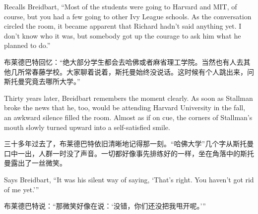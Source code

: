 \ifdefined\eng
Recalls Breidbart, ``Most of the students were going to Harvard and MIT, of course, but you had a few going to other Ivy League schools. As the conversation circled the room, it became apparent that Richard hadn't said anything yet. I don't know who it was, but somebody got up the courage to ask him what he planned to do.''
\fi

\ifdefined\chs
布莱德巴特回忆：``绝大部分学生都会去哈佛或者麻省理工学院。当然也有人去其他几所常春藤学校。大家聊着说着，斯托曼始终没说话。这时候有个人跳出来，问斯托曼究竟去哪所大学。''
\fi

\ifdefined\eng
Thirty years later, Breidbart remembers the moment clearly. As soon as Stallman broke the news that he, too, would be attending Harvard University in the fall, an awkward silence filled the room. Almost as if on cue, the corners of Stallman's mouth slowly turned upward into a self-satisfied smile.
\fi

\ifdefined\chs
三十多年过去了，布莱德巴特依旧清晰地记得那一刻。``哈佛大学''几个字从斯托曼口中一出，人群一时没了声音。一切都好像事先排练好的一样，坐在角落中的斯托曼露出了一丝微笑。
\fi

\ifdefined\eng
Says Breidbart, ``It was his silent way of saying, `That's right. You haven't got rid of me yet.'\hspace{0.01in}''
\fi

\ifdefined\chs
布莱德巴特说：``那微笑好像在说：`没错，你们还没把我甩开呢。'\hspace{0.01in}''
\fi

\theendnotes
\setcounter{endnote}{0}
